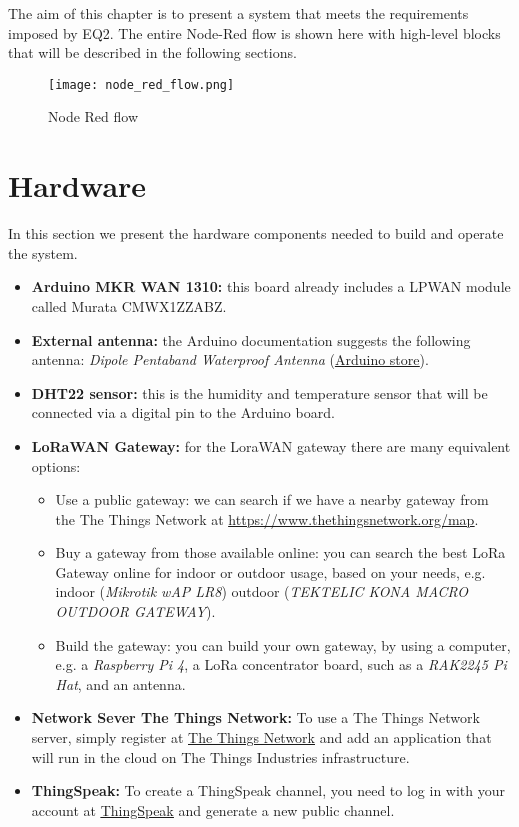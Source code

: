 The aim of this chapter is to present a system that meets the requirements imposed by EQ2.
The entire Node-Red flow is shown here with high-level blocks that will be described in the following sections.
\begin{figure}[H]
    \centering
    \texttt{[image: node\_red\_flow.png]}
    \caption{Node Red flow}
\end{figure}

\section{Hardware}
In this section we present the hardware components needed to build and operate the system. 
\begin{itemize}
\item \textbf{Arduino MKR WAN 1310:} this board already includes a LPWAN module called Murata CMWX1ZZABZ.
\item \textbf{External antenna:} the Arduino documentation suggests the following antenna: \textit{Dipole Pentaband Waterproof Antenna} ({\color{blue}\underline{\href{https://store.arduino.cc/products/dipole-pentaband-waterproof-antenna}{Arduino store}}}).
\item \textbf{DHT22 sensor:} this is the humidity and temperature sensor that will be connected via a digital pin to the Arduino board.
\item \textbf{LoRaWAN Gateway:} for the LoraWAN gateway there are many equivalent options:
\begin{itemize}
\item Use a public gateway: we can search if we have a nearby gateway from the The Things Network at {\color{blue}\underline{\url{https://www.thethingsnetwork.org/map}}}.
\item Buy a gateway from those available online: you can search the best LoRa Gateway online for indoor or outdoor usage, based on your needs, e.g. indoor (\textit{Mikrotik wAP
LR8}) outdoor (\textit{TEKTELIC KONA MACRO OUTDOOR GATEWAY}).
\item Build the gateway: you can build your own gateway, by using a computer, e.g. a \textit{Raspberry Pi 4}, a LoRa concentrator board, such as a \textit{RAK2245 Pi Hat}, and an antenna.
\end{itemize}
\item \textbf{Network Sever The Things Network:} To use a The Things Network server, simply register at {\color{blue}\underline{\href{https://console.cloud.thethings.network/}{The Things Network}}} and add an application that will run in the cloud on The Things Industries infrastructure.
\item \textbf{ThingSpeak:} To create a ThingSpeak channel, you need to log in with your account at {\color{blue}\underline{\href{https://thingspeak.mathworks.com/}{ThingSpeak}}} and generate a new public channel.
\end{itemize}
